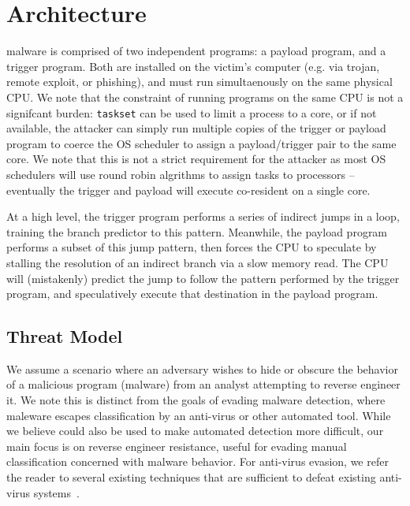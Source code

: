 

\section{Architecture}

\speculake malware is comprised of two independent programs: a payload program,
and a trigger program. Both are installed on the victim's computer (e.g. via
trojan, remote exploit, or phishing), and must run simultaenously on the same
physical CPU. We note that the constraint of running programs on the same CPU is
not a signifcant burden: \texttt{taskset} can be used to limit a process to a
core, or if not available, the attacker can simply run multiple copies of the
trigger or payload program to coerce the OS scheduler to assign a
payload/trigger pair to the same core. We note that this is not a strict requirement
for the attacker as most OS schedulers will use round robin algrithms to assign 
tasks to processors -- eventually the trigger and payload will execute co-resident
on a single core. 

At a high level, the trigger program performs a series of indirect jumps in a
loop, training the branch predictor to this pattern. Meanwhile, the
payload program performs a subset of this jump pattern, then forces the CPU to
speculate by stalling the resolution of an indirect branch via a slow memory
read. The CPU will (mistakenly) predict the jump to follow the pattern performed
by the trigger program, and speculatively execute that destination in the
payload program.


\subsection{Threat Model}

We assume a scenario where an adversary wishes to hide or obscure the behavior
of a malicious program (malware) from an analyst attempting to reverse engineer
it. We note this is distinct from the goals of evading malware detection, where
maleware escapes classification by an anti-virus or other automated tool. While
we believe \speculake could also be used to make automated detection more
difficult, our main focus is on reverse engineer resistance, useful for evading
manual classification concerned with malware behavior. For anti-virus evasion,
we refer the reader to several existing techniques that are sufficient to defeat
existing anti-virus
systems~\cite{jana2012abusing,oberheide2009polypack,ropinjector,swinnen2014one,ugarte2015sok}.


